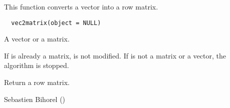 %
\begin{Description}\relax
This function converts a vector into a row matrix.
\end{Description}
%
\begin{Usage}
\begin{verbatim}
  vec2matrix(object = NULL)
\end{verbatim}
\end{Usage}
%
\begin{Arguments}
\begin{ldescription}
\item[\code{object}] A vector or a matrix.
\end{ldescription}
\end{Arguments}
%
\begin{Details}\relax
If  is already a matrix,  is not modified. If
 is not a matrix or a vector, the algorithm is stopped.
\end{Details}
%
\begin{Value}
Return a row matrix.
\end{Value}
%
\begin{Author}\relax
Sebastien Bihorel ()
\end{Author}
